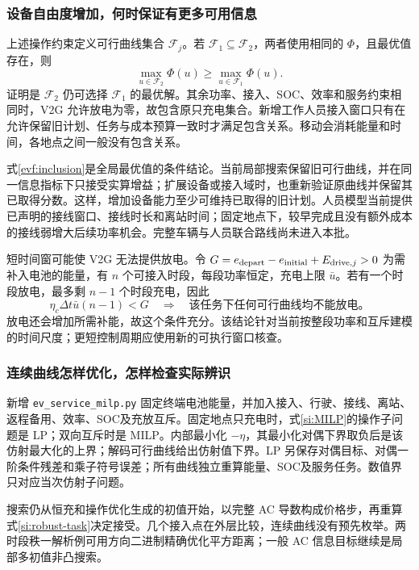 \subsubsection{设备自由度增加，何时保证有更多可用信息}

上述操作约束定义可行曲线集合 $\mathcal F_j$。若 $\mathcal F_1\subseteq\mathcal F_2$，两者使用相同的 $\Phi$，且最优值存在，则
\begin{equation}
 \max_{u\in\mathcal F_2}\Phi(u)\ge
 \max_{u\in\mathcal F_1}\Phi(u).
 \label{evf:inclusion}
\end{equation}
证明是 $\mathcal F_2$ 仍可选择 $\mathcal F_1$ 的最优解。其余功率、接入、SOC、效率和服务约束相同时，V2G 允许放电为零，故包含原只充电集合。新增工作人员接入窗口只有在允许保留旧计划、任务与成本预算一致时才满足包含关系。移动会消耗能量和时间，各地点之间一般没有包含关系。

式\eqref{evf:inclusion}是全局最优值的条件结论。当前局部搜索保留旧可行曲线，并在同一信息指标下只接受实算增益；扩展设备或接入域时，也重新验证原曲线并保留其已取得分数。这样，增加设备能力至少可维持已取得的旧计划。人员模型当前提供已声明的接线窗口、接线时长和离站时间；固定地点下，较早完成且没有额外成本的接线弱增大后续功率机会。完整车辆与人员联合路线尚未进入本批。

短时间窗可能使 V2G 无法提供放电。令 $G=e_{\rm depart}-e_{\rm initial}+E_{{\rm drive},j}>0$ 为需补入电池的能量，有 $n$ 个可接入时段，每段功率恒定，充电上限 $\bar u$。若有一个时段放电，最多剩 $n-1$ 个时段充电，因此
\begin{equation}
 \eta_c\Delta t\bar u(n-1)<G
 \quad\Longrightarrow\quad\text{该任务下任何可行曲线均不能放电。}
 \label{evf:short-window}
\end{equation}
放电还会增加所需补能，故这个条件充分。该结论针对当前按整段功率和互斥建模的时间尺度；更短控制周期应使用新的可执行窗口核查。

\subsubsection{连续曲线怎样优化，怎样检查实际辨识}

新增 \texttt{ev\_service\_milp.py} 固定终端电池能量，并加入接入、行驶、接线、离站、返程备用、效率、SOC及充放互斥。固定地点只充电时，式\eqref{si:MILP}的操作子问题是 LP；双向互斥时是 MILP。内部最小化 $-\eta$，其最小化对偶下界取负后是该仿射最大化的上界；解码可行曲线给出仿射值下界。LP 另保存对偶目标、对偶一阶条件残差和乘子符号误差；所有曲线独立重算能量、SOC及服务任务。数值界只对应当次仿射子问题。

搜索仍从恒充和操作优化生成的初值开始，以完整 AC 导数构成价格步，再重算式\eqref{si:robust-task}决定接受。几个接入点在外层比较，连续曲线没有预先枚举。两时段秩一解析例可用方向二进制精确优化平方距离；一般 AC 信息目标继续是局部多初值非凸搜索。

